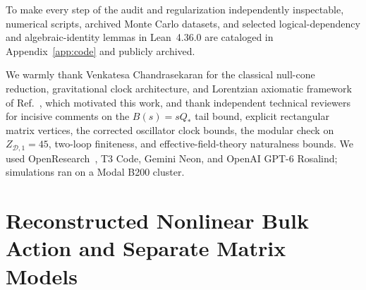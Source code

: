 \documentclass[onecolumn,11pt,aps,prd,amsmath,amssymb,nofootinbib,floatfix]{revtex4-2}
\newcommand{\scrD}{\mathscr{D}}
\begin{document}
To make every step of the audit and regularization independently inspectable, numerical scripts, archived Monte Carlo datasets, and selected logical-dependency and algebraic-identity lemmas in Lean~4.36.0 are cataloged in Appendix~\ref{app:code} and publicly archived.

\begin{acknowledgments}
We warmly thank Venkatesa Chandrasekaran for the classical null-cone reduction, gravitational clock architecture, and Lorentzian axiomatic framework of Ref.~\cite{Chandrasekaran2026}, which motivated this work, and thank independent technical reviewers for incisive comments on the $B(s)=s Q_*$ tail bound, explicit rectangular matrix vertices, the corrected oscillator clock bounds, the modular check on $Z_{\scrD,1}=45$, two-loop finiteness, and effective-field-theory naturalness bounds. We used OpenResearch~\cite{openresearch}, T3 Code, Gemini Neon, and OpenAI GPT-6 Rosalind; simulations ran on a Modal B200 cluster.
\end{acknowledgments}

\appendix

\section{Reconstructed Nonlinear Bulk Action and Separate Matrix Models}\label{app:explicit_action}


\end{document}
